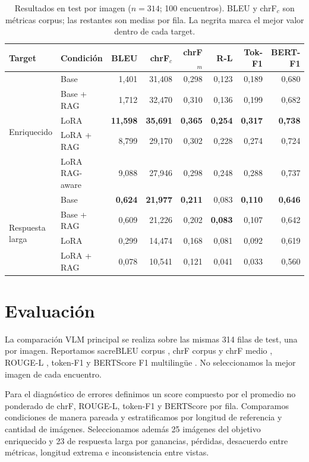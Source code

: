 \documentclass[11pt]{article}
\begin{document}
\begin{table}[t]
\centering
\scriptsize
\setlength{\tabcolsep}{3.4pt}
\begin{tabular}{llrrrrrr}
\toprule
Target & Condición & BLEU & chrF$_c$ & chrF$_m$ & R-L & Tok-F1 & BERT-F1 \\
\midrule
\multirow{5}{*}{Enriquecido}
 & Base & 1,401 & 31,408 & 0,298 & 0,123 & 0,189 & 0,680 \\
 & Base + RAG & 1,712 & 32,470 & 0,310 & 0,136 & 0,199 & 0,682 \\
 & LoRA & \textbf{11,598} & \textbf{35,691} & \textbf{0,365} & \textbf{0,254} & \textbf{0,317} & \textbf{0,738} \\
 & LoRA + RAG & 8,799 & 29,170 & 0,302 & 0,228 & 0,274 & 0,724 \\
 & LoRA RAG-aware & 9,088 & 27,946 & 0,298 & 0,248 & 0,288 & 0,737 \\
\midrule
\multirow{4}{*}{Respuesta larga}
 & Base & \textbf{0,624} & \textbf{21,977} & \textbf{0,211} & 0,083 & \textbf{0,110} & \textbf{0,646} \\
 & Base + RAG & 0,609 & 21,226 & 0,202 & \textbf{0,083} & 0,107 & 0,642 \\
 & LoRA & 0,299 & 14,474 & 0,168 & 0,081 & 0,092 & 0,619 \\
 & LoRA + RAG & 0,078 & 10,541 & 0,121 & 0,041 & 0,033 & 0,560 \\
\bottomrule
\end{tabular}
\caption{Resultados en test por imagen ($n=314$; 100 encuentros). BLEU y chrF$_c$ son métricas corpus; las restantes son medias por fila. La negrita marca el mejor valor dentro de cada target.}
\label{tab:vlm}
\end{table}

\section{Evaluación}

La comparación VLM principal se realiza sobre las mismas 314 filas de test, una por imagen. Reportamos sacreBLEU corpus \citep{post2018sacrebleu}, chrF corpus y chrF medio \citep{popovic2015chrf}, ROUGE-L \citep{lin2004rouge}, token-F1 y BERTScore F1 multilingüe \citep{zhang2020bertscore}. No seleccionamos la mejor imagen de cada encuentro.

Para el diagnóstico de errores definimos un score compuesto por el promedio no ponderado de chrF, ROUGE-L, token-F1 y BERTScore por fila. Comparamos condiciones de manera pareada y estratificamos por longitud de referencia y cantidad de imágenes. Seleccionamos además 25 imágenes del objetivo enriquecido y 23 de respuesta larga por ganancias, pérdidas, desacuerdo entre métricas, longitud extrema e inconsistencia entre vistas.
\end{document}
